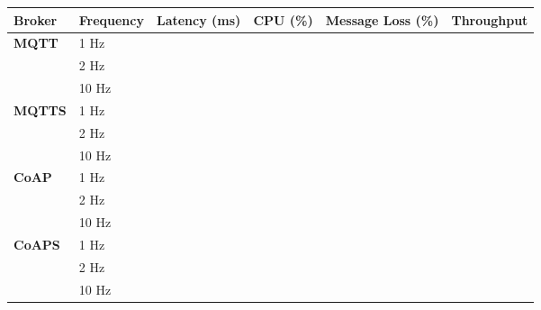 \documentclass{article}
\begin{document}

\begin{figure*}[]
    \centering

    \renewcommand{\arraystretch}{1.5}

    \begin{tabularx}{\textwidth}{lXXXXX}
        \toprule
        \textbf{Broker} & \textbf{Frequency} & \textbf{Latency (ms)} & \textbf{CPU (\%)} & \textbf{Message Loss (\%)} & \textbf{Throughput} \\
        \midrule

        \multirow{3}{*}{\textbf{MQTT}}
            & 1 Hz & & & & \\
            & 2 Hz & & & & \\
            & 10 Hz & & & & \\

        \cmidrule(lr){1-6}

        \multirow{3}{*}{\textbf{MQTTS}} 
            & 1 Hz & & & & \\
            & 2 Hz & & & & \\
            & 10 Hz & & & & \\

        \cmidrule(lr){1-6}

        \multirow{3}{*}{\textbf{CoAP}} 
            & 1 Hz & & & & \\
            & 2 Hz & & & & \\
            & 10 Hz & & & & \\

        \cmidrule(lr){1-6}

        \multirow{3}{*}{\textbf{CoAPS}} 
            & 1 Hz & & & & \\
            & 2 Hz & & & & \\
            & 10 Hz & & & & \\

        \bottomrule
    \end{tabularx}

\end{figure*}
\end{document}
